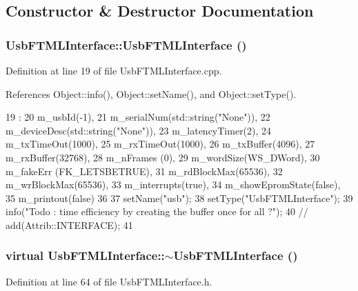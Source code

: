 \subsection{Constructor \& Destructor Documentation}
\hypertarget{classUsbFTMLInterface_aeb03292247ac4f7af188836b5c961f5d}{
\subsubsection[{UsbFTMLInterface}]{\setlength{\rightskip}{0pt plus 5cm}UsbFTMLInterface::UsbFTMLInterface ()}}
\label{classUsbFTMLInterface_aeb03292247ac4f7af188836b5c961f5d}


Definition at line 19 of file UsbFTMLInterface.cpp.

References Object::info(), Object::setName(), and Object::setType().


\begin{DoxyCode}
19                                      : 
20   m_usbId(-1),
21   m_serialNum(std::string("None")),
22   m_deviceDesc(std::string("None")),
23   m_latencyTimer(2),
24   m_txTimeOut(1000),
25   m_rxTimeOut(1000),
26   m_txBuffer(4096),
27   m_rxBuffer(32768),
28   m_nFrames (0),
29   m_wordSize(WS_DWord),
30   m_fakeErr (FK_LETSBETRUE),
31   m_rdBlockMax(65536),
32   m_wrBlockMax(65536),
33   m_interrupts(true),
34   m_showEpromState(false),
35   m_printout(false)
36 { 
37   setName("usb");
38   setType("UsbFTMLInterface");
39   info("Todo : time efficiency by creating the buffer once for all ?");
40   //  add(Attrib::INTERFACE);
41 }
\end{DoxyCode}
\hypertarget{classUsbFTMLInterface_a0bf44726e717235861347e61ac76a799}{
\subsubsection[{$\sim$UsbFTMLInterface}]{\setlength{\rightskip}{0pt plus 5cm}virtual UsbFTMLInterface::$\sim$UsbFTMLInterface ()}}
\label{classUsbFTMLInterface_a0bf44726e717235861347e61ac76a799}


Definition at line 64 of file UsbFTMLInterface.h.

